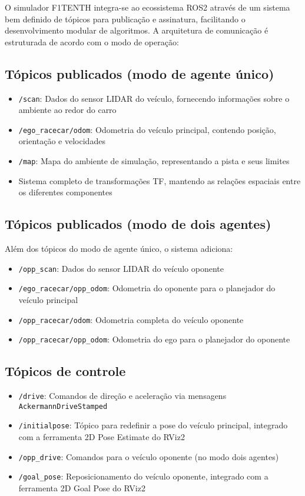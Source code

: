 O simulador F1TENTH integra-se ao ecossistema ROS2 através de um sistema bem
definido de tópicos para publicação e assinatura, facilitando o desenvolvimento
modular de algoritmos. A arquitetura de comunicação é estruturada de acordo com
o modo de operação:

\subsection{Tópicos publicados (modo de agente único)}
\begin{itemize}
    \item \texttt{/scan}: Dados do sensor LIDAR do veículo, fornecendo informações sobre o ambiente ao redor do carro
    \item \texttt{/ego\_racecar/odom}: Odometria do veículo principal, contendo posição, orientação e velocidades
    \item \texttt{/map}: Mapa do ambiente de simulação, representando a pista e seus limites
    \item Sistema completo de transformações TF, mantendo as relações espaciais entre os
          diferentes componentes
\end{itemize}

\subsection{Tópicos publicados (modo de dois agentes)}
Além dos tópicos do modo de agente único, o sistema adiciona:
\begin{itemize}
    \item \texttt{/opp\_scan}: Dados do sensor LIDAR do veículo oponente
    \item \texttt{/ego\_racecar/opp\_odom}: Odometria do oponente para o planejador do veículo principal
    \item \texttt{/opp\_racecar/odom}: Odometria completa do veículo oponente
    \item \texttt{/opp\_racecar/opp\_odom}: Odometria do ego para o planejador do oponente
\end{itemize}

\subsection{Tópicos de controle}
\begin{itemize}
    \item \texttt{/drive}: Comandos de direção e aceleração via mensagens \texttt{AckermannDriveStamped}
    \item \texttt{/initialpose}: Tópico para redefinir a pose do veículo principal, integrado com a ferramenta 2D Pose Estimate do RViz2
    \item \texttt{/opp\_drive}: Comandos para o veículo oponente (no modo dois agentes)
    \item \texttt{/goal\_pose}: Reposicionamento do veículo oponente, integrado com a ferramenta 2D Goal Pose do RViz2
\end{itemize}

